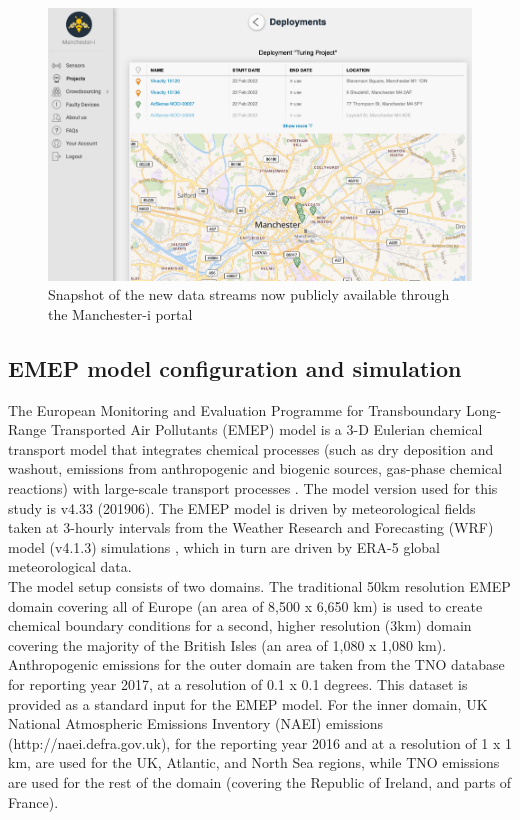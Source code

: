 \documentclass{article}
\begin{document}
\begin{figure}
	\centering
	\includegraphics[width=0.95\linewidth]{Figures/manchester-i-1.png}	
	\caption{Snapshot of the new data streams now publicly available through the Manchester-i portal} \label{fig::manchesteri}
\end{figure}

\clearpage
\subsection{EMEP model configuration and simulation}


The European Monitoring and Evaluation Programme for Transboundary Long-Range Transported Air Pollutants (EMEP) model is a 3-D Eulerian chemical transport model that integrates chemical processes (such as dry deposition and washout, emissions from anthropogenic and biogenic sources, gas-phase chemical reactions) with large-scale transport processes \citep{Simpson2012}. The model version used for this study is v4.33 (201906). The EMEP model is driven by meteorological fields taken at 3-hourly intervals from the Weather Research and Forecasting (WRF) model (v4.1.3) simulations \citep{Skamarock2019}, which in turn are driven by ERA-5 global meteorological data. \\

\noindent The model setup consists of two domains. The traditional 50km resolution EMEP domain covering all of Europe (an area of 8,500 x 6,650 km) is used to create chemical boundary conditions for a second, higher resolution (3km) domain covering the majority of the British Isles (an area of 1,080 x 1,080 km). Anthropogenic emissions for the outer domain are taken from the TNO database for reporting year 2017, at a resolution of 0.1 x 0.1 degrees. This dataset is provided as a standard input for the EMEP model. For the inner domain, UK National Atmospheric Emissions Inventory (NAEI) emissions (http://naei.defra.gov.uk), for the reporting year 2016 and at a resolution of 1 x 1 km, are used for the UK, Atlantic, and North Sea regions, while TNO emissions are used for the rest of the domain (covering the Republic of Ireland, and parts of France).
\end{document}
